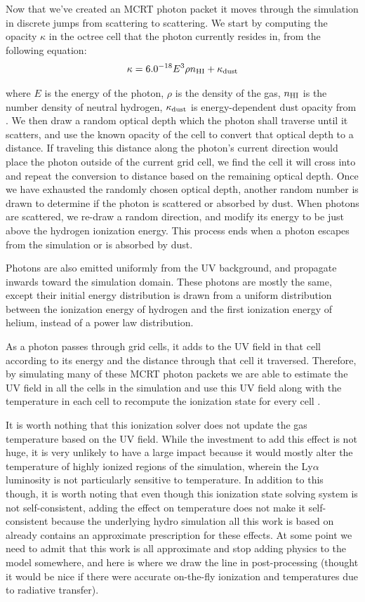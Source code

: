 Now that we've created an MCRT photon packet it moves through the simulation in discrete jumps from scattering to scattering.
We start by computing the opacity $\kappa$ in the octree cell that the photon currently resides in, from the following equation:
\begin{equation}
    \label{eq:lycrt_opacity}
    \kappa = 6.0^{-18} E^{3} \rho n_{\rm{HI}} + \kappa_{\rm{dust}}
\end{equation}

where $E$ is the energy of the photon, $\rho$ is the density of the gas, $n_{\rm{HI}}$ is the number density of neutral hydrogen, $\kappa_{\rm{dust}}$ is energy-dependent dust opacity from \citet{Weingartner2001}.
We then draw a random optical depth which the photon shall traverse until it scatters, and use the known opacity of the cell to convert that optical depth to a distance.
If traveling this distance along the photon's current direction would place the photon outside of the current grid cell, we find the cell it will cross into and repeat the conversion to distance based on the remaining optical depth.
Once we have exhausted the randomly chosen optical depth, another random number is drawn to determine if the photon is scattered or absorbed by dust.
When photons are scattered, we re-draw a random direction, and modify its energy to be just above the hydrogen ionization energy.
This process ends when a photon escapes from the simulation or is absorbed by dust.

Photons are also emitted uniformly from the UV background, and propagate inwards toward the simulation domain.
These photons are mostly the same, except their initial energy distribution is drawn from a uniform distribution between the ionization energy of hydrogen and the first ionization energy of helium, instead of a power law distribution.

As a photon passes through grid cells, it adds to the UV field in that cell according to its energy and the distance through that cell it traversed.
Therefore, by simulating many of these MCRT photon packets we are able to estimate the UV field in all the cells in the simulation and use this UV field along with the temperature in each cell to recompute the ionization state for every cell \citep{Kasen2006}.

It is worth nothing that this ionization solver does not update the gas temperature based on the UV field.
While the investment to add this effect is not huge, it is very unlikely to have a large impact because it would mostly alter the temperature of highly ionized regions of the simulation, wherein the Ly$\alpha$ luminosity is not particularly sensitive to temperature.
In addition to this though, it is worth noting that even though this ionization state solving system is not self-consistent, adding the effect on temperature does not make it self-consistent because the underlying hydro simulation all this work is based on already contains an approximate prescription for these effects.
At some point we need to admit that this work is all approximate and stop adding physics to the model somewhere, and here is where we draw the line in post-processing (thought it would be nice if there were accurate on-the-fly ionization and temperatures due to radiative transfer).


